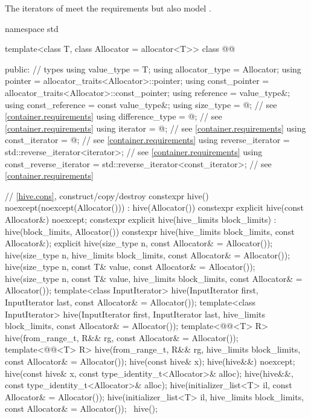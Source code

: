 \pnum
The iterators of  meet
the  requirements
but also model .

\begin{codeblock}
namespace std {
  template<class T, class Allocator = allocator<T>>
  class @@ {
  public:
    // types
    using value_type = T;
    using allocator_type = Allocator;
    using pointer = allocator_traits<Allocator>::pointer;
    using const_pointer = allocator_traits<Allocator>::const_pointer;
    using reference = value_type&;
    using const_reference = const value_type&;
    using size_type = @\impdef@;                               // see \ref{container.requirements}
    using difference_type = @\impdef@;                         // see \ref{container.requirements}
    using iterator = @\impdef@;                                // see \ref{container.requirements}
    using const_iterator = @\impdef@;                          // see \ref{container.requirements}
    using reverse_iterator = std::reverse_iterator<iterator>;               // see \ref{container.requirements}
    using const_reverse_iterator = std::reverse_iterator<const_iterator>;   // see \ref{container.requirements}

    // \ref{hive.cons}, construct/copy/destroy
    constexpr hive() noexcept(noexcept(Allocator())) : hive(Allocator()) {}
    constexpr explicit hive(const Allocator&) noexcept;
    constexpr explicit hive(hive_limits block_limits) : hive(block_limits, Allocator()) {}
    constexpr hive(hive_limits block_limits, const Allocator&);
    explicit hive(size_type n, const Allocator& = Allocator());
    hive(size_type n, hive_limits block_limits, const Allocator& = Allocator());
    hive(size_type n, const T& value, const Allocator& = Allocator());
    hive(size_type n, const T& value, hive_limits block_limits, const Allocator& = Allocator());
    template<class InputIterator>
      hive(InputIterator first, InputIterator last, const Allocator& = Allocator());
    template<class InputIterator>
      hive(InputIterator first, InputIterator last, hive_limits block_limits,
           const Allocator& = Allocator());
    template<@@<T> R>
      hive(from_range_t, R&& rg, const Allocator& = Allocator());
    template<@@<T> R>
      hive(from_range_t, R&& rg, hive_limits block_limits, const Allocator& = Allocator());
    hive(const hive& x);
    hive(hive&&) noexcept;
    hive(const hive& x, const type_identity_t<Allocator>& alloc);
    hive(hive&&, const type_identity_t<Allocator>& alloc);
    hive(initializer_list<T> il, const Allocator& = Allocator());
    hive(initializer_list<T> il, hive_limits block_limits, const Allocator& = Allocator());
    ~hive();

}}
\end{codeblock}
